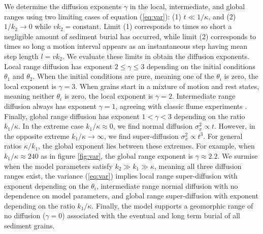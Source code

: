 \documentclass[draft,grl]{agujournal2018}
\begin{document}
We determine the diffusion exponents $\gamma$ in the local, intermediate, and global ranges using two limiting cases of equation (\ref{eq:var}): (1) $t\ll 1/\kappa$, and (2) $1/k_2 \rightarrow 0$ while $vk_2 = \text{constant}$.
Limit (1) corresponds to times so short a negligible amount of sediment burial has occurred, while limit (2) corresponds to times so long a motion interval appears as an instantaneous step having mean step length $l=vk_2$.
We evaluate these limits in  obtain the diffusion exponents.
Local range diffusion has exponent $2 \leq \gamma \leq 3$ depending on the initial conditions $\theta_1$ and $\theta_2$.
When the initial conditions are pure, meaning one of the $\theta_i$ is zero, the local exponent is $\gamma=3$.
When grains start in a mixture of motion and rest states, meaning neither $\theta_i$ is zero, the local exponent is $\gamma=2$.
Intermediate range diffusion always has exponent $\gamma=1$, agreeing with classic flume experiments \citep[e.g.,][]{Einstein1937,Yano1969a,Nakagawa1976}.
Finally, global range diffusion has exponent $1 < \gamma < 3$ depending on the ratio $k_1/\kappa$.
In the extreme case $k_1/\kappa \approx 0 $, we find normal diffusion $\sigma_x^2 \propto t$. 
However, in the opposite extreme $k_1/\kappa \rightarrow \infty$, we find  super-diffusion $\sigma_x^2 \propto t^3$.
For general ratios $\kappa/k_1$, the global exponent lies between these extremes.
For example, when $k_1/\kappa \approx 240$ as in figure \ref{fig:var}, the global range exponent is $\gamma \approx 2.2$. 
We surmise when the model parameters satisfy $k_2\gg k_1 \gg \kappa$, meaning all three diffusion ranges exist, the variance (\ref{eq:var}) implies local range super-diffusion with exponent depending on the $\theta_i$, intermediate range normal diffusion with no dependence on model parameters, and global range super-diffusion with exponent depending on the ratio $k_1/\kappa$.
Finally, the model supports a geomorphic range of no diffusion ($\gamma=0$) associated with the eventual and long term burial of all sediment grains.
\end{document}
